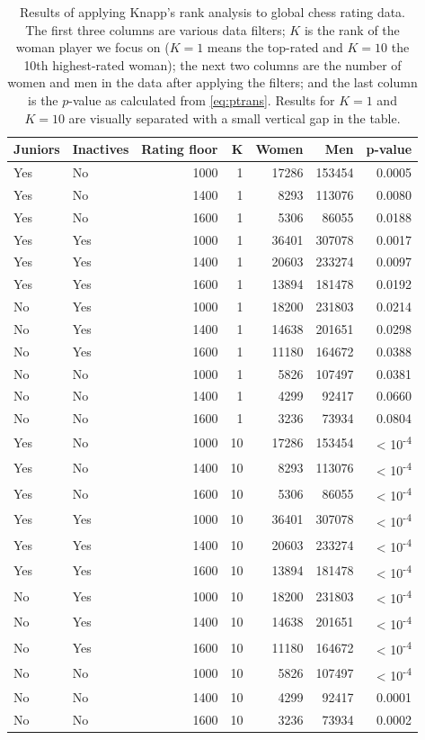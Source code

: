 \documentclass[9pt,twoside,lineno]{pnas-new}
\begin{document}
\begin{table}[!ht]
\centering
\caption{Results of applying Knapp's rank analysis to global chess rating data. The first three columns are various data filters; $K$ is the rank of the woman player we focus on ($K = 1$ means the top-rated and $K = 10$ the 10th highest-rated woman); the next two columns are the number of women and men in the data after applying the filters; and the last column is the $p$-value as calculated from \eqref{eq:ptrans}. Results for $K = 1$ and $K = 10$ are visually separated with a small vertical gap in the table.}
\label{tab:knapp-global}
\begin{tabular}[t]{llrrrrr}
\toprule
Juniors & Inactives & Rating floor & K & Women & Men & p-value\\
\midrule
Yes & No & 1000 & 1 & 17286 & 153454 & 0.0005\\
Yes & No & 1400 & 1 & 8293 & 113076 & 0.0080\\
Yes & No & 1600 & 1 & 5306 & 86055 & 0.0188\\
Yes & Yes & 1000 & 1 & 36401 & 307078 & 0.0017\\
Yes & Yes & 1400 & 1 & 20603 & 233274 & 0.0097\\
Yes & Yes & 1600 & 1 & 13894 & 181478 & 0.0192\\
No & Yes & 1000 & 1 & 18200 & 231803 & 0.0214\\
No & Yes & 1400 & 1 & 14638 & 201651 & 0.0298\\
No & Yes & 1600 & 1 & 11180 & 164672 & 0.0388\\
No & No & 1000 & 1 & 5826 & 107497 & 0.0381\\
No & No & 1400 & 1 & 4299 & 92417 & 0.0660\\
No & No & 1600 & 1 & 3236 & 73934 & 0.0804\\
\addlinespace
Yes & No & 1000 & 10 & 17286 & 153454 & < 10\textsuperscript{-4}\\
Yes & No & 1400 & 10 & 8293 & 113076 & < 10\textsuperscript{-4}\\
Yes & No & 1600 & 10 & 5306 & 86055 & < 10\textsuperscript{-4}\\
Yes & Yes & 1000 & 10 & 36401 & 307078 & < 10\textsuperscript{-4}\\
Yes & Yes & 1400 & 10 & 20603 & 233274 & < 10\textsuperscript{-4}\\
Yes & Yes & 1600 & 10 & 13894 & 181478 & < 10\textsuperscript{-4}\\
No & Yes & 1000 & 10 & 18200 & 231803 & < 10\textsuperscript{-4}\\
No & Yes & 1400 & 10 & 14638 & 201651 & < 10\textsuperscript{-4}\\
No & Yes & 1600 & 10 & 11180 & 164672 & < 10\textsuperscript{-4}\\
No & No & 1000 & 10 & 5826 & 107497 & < 10\textsuperscript{-4}\\
No & No & 1400 & 10 & 4299 & 92417 & 0.0001\\
No & No & 1600 & 10 & 3236 & 73934 & 0.0002\\
\bottomrule
\end{tabular}
\end{table}
\end{document}
